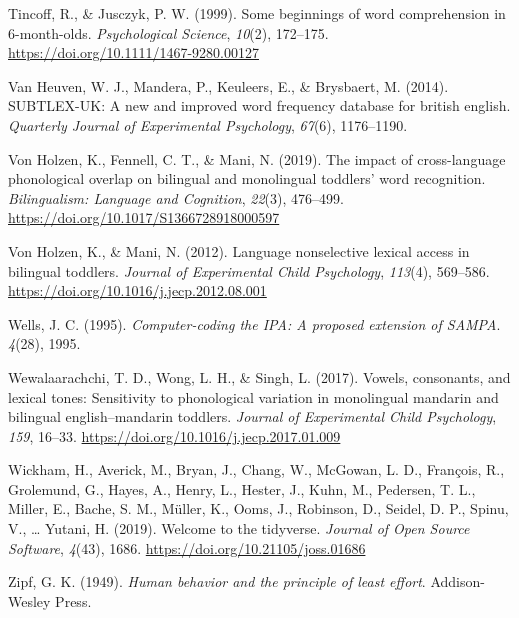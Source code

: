 \documentclass[
]{article}
\newlength{\cslhangindent}
\newlength{\cslentryspacingunit} %
\newenvironment{CSLReferences}[2] %
 {%
  \setlength{\parindent}{0pt}
  \ifodd #1
  \let\oldpar\par
  \def\par{\hangindent=\cslhangindent\oldpar}
  \fi
  \setlength{\parskip}{#2\cslentryspacingunit}
 }%
 {}
\begin{document}
\begin{CSLReferences}{1}{0}
\leavevmode{}%
Tincoff, R., \& Jusczyk, P. W. (1999). Some beginnings of word
comprehension in 6-month-olds. \emph{Psychological Science},
\emph{10}(2), 172--175. \url{https://doi.org/10.1111/1467-9280.00127}

\leavevmode{}%
Van Heuven, W. J., Mandera, P., Keuleers, E., \& Brysbaert, M. (2014).
{SUBTLEX}-{UK}: A new and improved word frequency database for british
english. \emph{Quarterly Journal of Experimental Psychology},
\emph{67}(6), 1176--1190.

\leavevmode{}%
Von Holzen, K., Fennell, C. T., \& Mani, N. (2019). The impact of
cross-language phonological overlap on bilingual and monolingual
toddlers' word recognition. \emph{Bilingualism: Language and Cognition},
\emph{22}(3), 476--499. \url{https://doi.org/10.1017/S1366728918000597}

\leavevmode{}%
Von Holzen, K., \& Mani, N. (2012). Language nonselective lexical access
in bilingual toddlers. \emph{Journal of Experimental Child Psychology},
\emph{113}(4), 569--586.
\url{https://doi.org/10.1016/j.jecp.2012.08.001}

\leavevmode{}%
Wells, J. C. (1995). \emph{Computer-coding the {IPA}: A proposed
extension of {SAMPA}}. \emph{4}(28), 1995.

\leavevmode{}%
Wewalaarachchi, T. D., Wong, L. H., \& Singh, L. (2017). Vowels,
consonants, and lexical tones: Sensitivity to phonological variation in
monolingual mandarin and bilingual english--mandarin toddlers.
\emph{Journal of Experimental Child Psychology}, \emph{159}, 16--33.
\url{https://doi.org/10.1016/j.jecp.2017.01.009}

\leavevmode{}%
Wickham, H., Averick, M., Bryan, J., Chang, W., McGowan, L. D.,
François, R., Grolemund, G., Hayes, A., Henry, L., Hester, J., Kuhn, M.,
Pedersen, T. L., Miller, E., Bache, S. M., Müller, K., Ooms, J.,
Robinson, D., Seidel, D. P., Spinu, V., \ldots{} Yutani, H. (2019).
Welcome to the tidyverse. \emph{Journal of Open Source Software},
\emph{4}(43), 1686. \url{https://doi.org/10.21105/joss.01686}

\leavevmode{}%
Zipf, G. K. (1949). \emph{Human behavior and the principle of least
effort}. Addison-Wesley Press.

\end{CSLReferences}
\end{document}
